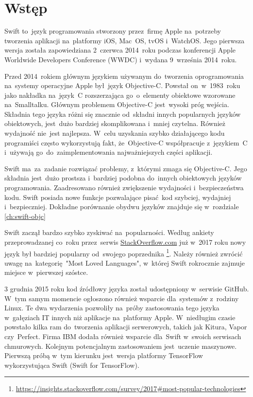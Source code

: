 \documentclass[mgr, shortabstract]{iithesis}
\author         {Karol Wieczorek}
\begin{document}

\chapter{Wstęp}
\label{ch:wstep}

Swift to~język programowania stworzony przez~firmę Apple na~potrzeby tworzenia aplikacji na~platformy iOS, Mac~OS, tvOS i~WatchOS. Jego pierwsza wersja została zapowiedziana 2~czerwca 2014~roku podczas konferencji Apple Worldwide Developers Conference (WWDC) i~wydana 9~września 2014~roku.

Przed 2014~rokiem głównym językiem używanym do~tworzenia oprogramowania na~systemy operacyjne Apple był~język Objective-C. Powstał on~w~1983~roku jako nakładka na~język~C rozszerzająca go~o~elementy obiektowe wzorowane na~Smalltalku. Głównym problemem Objective-C jest~wysoki próg wejścia. Składnia tego języka różni się znacznie od~składni innych popularnych języków obiektowych, jest~dużo bardziej skomplikowana i~mniej czytelna. Również wydajność nie~jest najlepsza. W~celu uzyskania szybko działającego kodu programiści często wykorzystują fakt, że~Objective-C współpracuje z~językiem~C i~używają go~do~zaimplementowania najważniejszych części aplikacji. 

Swift ma~za~zadanie rozwiązać problemy, z~którymi zmaga się Objective-C. Jego składnia jest~dużo prostsza i~bardziej podobna do~innych obiektowych języków programowania. Zaadresowano również zwiększenie wydajności i~bezpieczeństwa kodu. Swift posiada nowe funkcje pozwalające pisać kod szybciej, wydajniej i~bezpieczniej. Dokładne porównanie obydwu języków znajduje się w~rozdziale \ref{ch:swift-objc}

Swift zaczął bardzo szybko zyskiwać na~popularności. Według ankiety przeprowadzanej co~roku przez~serwis \url{StackOverflow.com} już w~2017 roku nowy język był bardziej popularny od~swojego poprzednika \footnote{\url{https://insights.stackoverflow.com/survey/2017\#most-popular-technologies}}. Należy również zwrócić uwagę na~kategorię "Most Loved Languages", w~której Swift rokrocznie zajmuje miejsce w~pierwszej szóstce.

3 grudnia 2015 roku kod źródłowy języka został udostępniony w~serwisie GitHub. W~tym samym momencie ogłoszono również wsparcie dla~systemów z~rodziny Linux. Te dwa wydarzenia pozwoliły na~próby zastosowania tego języka w~gałęziach IT innych niż aplikacje na~platformy Apple. W~niedługim czasie powstało kilka ram do~tworzenia aplikacji serwerowych, takich jak Kitura, Vapor czy~Perfect. Firma IBM dodała również wsparcie dla~Swift w~swoich serwisach chmurowych. Kolejnym potencjalnym zastosowaniem jest~uczenie maszynowe. Pierwszą próbą w~tym kierunku jest~wersja platformy TensorFlow wykorzystująca Swift (Swift for TensorFlow).
\end{document}
